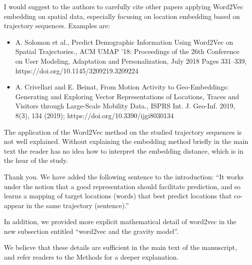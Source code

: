 \documentclass[12pt,a4paper]{article}
\newcommand{\response}[1]{{\leavevmode\noindent #1}}
\newcommand{\rcomment}[1]{%
\vspace{10pt}
\begin{tcolorbox}[colback=black!3,colframe=white!45!black]
#1
\end{tcolorbox}
}
\begin{document}
\rcomment{
I would suggest to the authors to carefully cite other papers applying Word2Vec embedding on spatial data, especially focusing on location embedding based on trajectory sequences. Examples are:
\begin{itemize}
\item A. Solomon et al., Predict Demographic Information Using Word2Vec on Spatial Trajectories., ACM UMAP '18: Proceedings of the 26th Conference on User Modeling, Adaptation and Personalization, July 2018 Pages 331–339, https://doi.org/10.1145/3209219.3209224
\item A. Crivellari and E. Beinat, From Motion Activity to Geo-Embeddings: Generating and Exploring Vector Representations of Locations, Traces and Visitors through Large-Scale Mobility Data., ISPRS Int. J. Geo-Inf. 2019, 8(3), 134 (2019); https://doi.org/10.3390/ijgi8030134

\end{itemize}

The application of the Word2Vec method on the studied trajectory sequences is not well explained. Without explaining the embedding method briefly in the main text the reader has no idea how to interpret the embedding distance, which is in the hear of the study.

}

\response{
Thank you. We have added the following sentence to the introduction: “It works under the notion that a good representation should facilitate prediction, and so learns a mapping of target locations (words) that best predict locations that co-appear in the same trajectory (sentence).”

In addition, we provided more explicit mathematical detail of word2vec in the new subsection entitled “word2vec and the gravity model”. 

We believe that these details are sufficient in the main text of the manuscript, and refer readers to the Methods for a deeper explanation.
}
\end{document}
